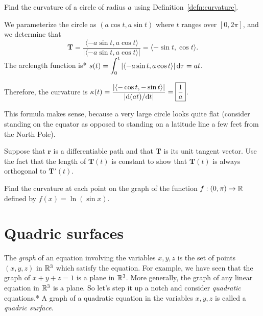 \documentclass{watsonbook}
\begin{document}
\begin{example}{}{}
  Find the curvature of a circle of radius $a$ using
  Definition~\ref{defn:curvature}. 
\end{example}

\begin{solution}
  We parameterize the circle as $(a \cos t, a \sin t)$ where $t$
  ranges over $[0,2\pi]$, and we determine that
  \[
    \mathbf{T} = \frac{\langle -a \sin t, a \cos t\rangle }{|\langle
      -a \sin t, a \cos t\rangle|} = \langle -\sin t, \cos t \rangle. 
  \]
  The arclength function is* $s(t) = \displaystyle{\int_0^t |\langle -a \sin t, a \cos
    t\rangle| \, \mathrm{d}\tau} = at$. 

  Therefore, the curvature is $\displaystyle{\kappa(t) = \frac{|\langle -\cos t, -\sin t
      \rangle|}{|\mathrm{d}(at)/\mathrm{d}t|} = \boxed{\frac{1}{a}}}$.

  This formula makes sense, because a very large circle looks quite flat
  (consider standing on the equator as opposed to standing on a
  latitude line a few feet from the North Pole).
\end{solution}

\begin{exercise}{}{}
  Suppose that $\mathbf{r}$ is a differentiable path and that
  $\mathbf{T}$ is its unit tangent vector. Use the fact that the
  length of $\mathbf{T}(t)$ is constant to show that $\mathbf{T}(t)$ is
  always orthogonal to $\mathbf{T}'(t)$.
\end{exercise}

\begin{exercise}{}{}
  Find the curvature at each point on the graph of the function
  $f:(0,\pi) \to \mathbb{R}$ defined by  $f(x) = \ln (\sin x)$. 
\end{exercise}

\section{Quadric surfaces} \label{sec:quadric_surfaces} 

The \textit{graph} of an equation involving the variables $x,y,z$ is
the set of points $(x,y,z)$ in $\mathbb{R}^3$ which satisfy the equation. For
example, we have seen that the graph of $x + y + z = 1$ is a plane in
$\mathbb{R}^3$. More generally, the graph of any linear equation in $\mathbb{R}^3$ is
a plane. So let's step it up a notch and consider \textit{quadratic}
equations.*  A graph of a quadratic
equation in the variables $x,y,z$ is called a \textit{quadric
  surface}. 
\end{document}
